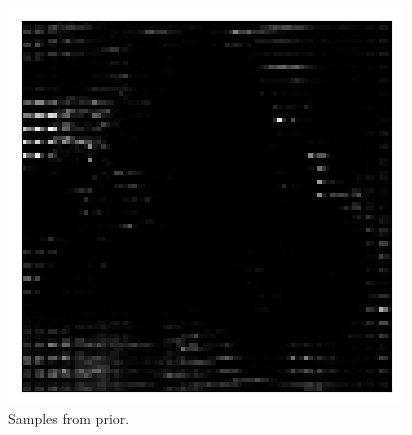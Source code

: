 \begin{figure}[h!]
\begin{multicols}{4}
    \includegraphics[scale=0.4]{figures/results/latent_image/beta_1_prior_sample_3.png}
\end{multicols}
\caption{Samples from prior.}
\label{fig:latent_image_originals_prior_samples}
\end{figure}


